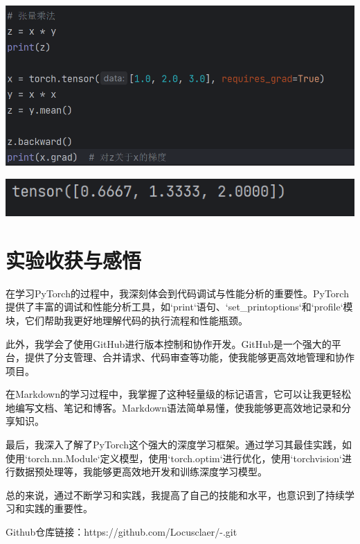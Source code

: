 \documentclass[UTF8,a4paper]{ctexart}
\begin{document}
\begin{sloppypar}
	\includegraphics[width = 14cm]{43}
	
	\includegraphics[width = 14cm]{44}
	
	\section{实验收获与感悟}
	在学习PyTorch的过程中，我深刻体会到代码调试与性能分析的重要性。PyTorch提供了丰富的调试和性能分析工具，如`print`语句、`set\_printoptions`和`profile`模块，它们帮助我更好地理解代码的执行流程和性能瓶颈。
	
	此外，我学会了使用GitHub进行版本控制和协作开发。GitHub是一个强大的平台，提供了分支管理、合并请求、代码审查等功能，使我能够更高效地管理和协作项目。
	
	在Markdown的学习过程中，我掌握了这种轻量级的标记语言，它可以让我更轻松地编写文档、笔记和博客。Markdown语法简单易懂，使我能够更高效地记录和分享知识。
	
	最后，我深入了解了PyTorch这个强大的深度学习框架。通过学习其最佳实践，如使用`torch.nn.Module`定义模型，使用`torch.optim`进行优化，使用`torchvision`进行数据预处理等，我能够更高效地开发和训练深度学习模型。
	
	总的来说，通过不断学习和实践，我提高了自己的技能和水平，也意识到了持续学习和实践的重要性。
	
	Github仓库链接：https://github.com/Locusclaer/-.git
	
\end{sloppypar}
\end{document}
